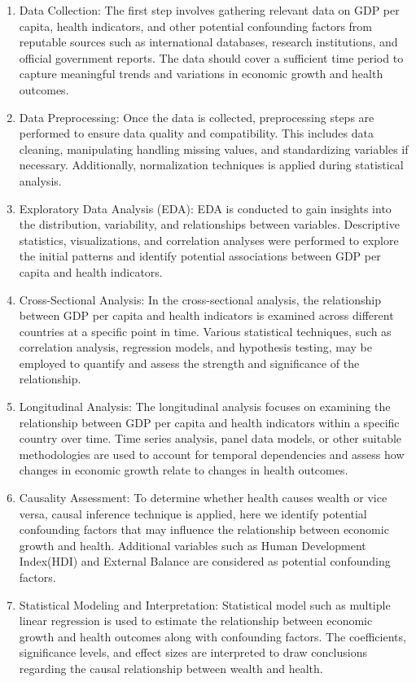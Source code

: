 \documentclass[
]{article}
\begin{document}
\begin{enumerate}
\def\labelenumi{\arabic{enumi}.}
\item
  Data Collection: The first step involves gathering relevant data on
  GDP per capita, health indicators, and other potential confounding
  factors from reputable sources such as international databases,
  research institutions, and official government reports. The data
  should cover a sufficient time period to capture meaningful trends and
  variations in economic growth and health outcomes.
\item
  Data Preprocessing: Once the data is collected, preprocessing steps
  are performed to ensure data quality and compatibility. This includes
  data cleaning, manipulating handling missing values, and standardizing
  variables if necessary. Additionally, normalization techniques is
  applied during statistical analysis.
\item
  Exploratory Data Analysis (EDA): EDA is conducted to gain insights
  into the distribution, variability, and relationships between
  variables. Descriptive statistics, visualizations, and correlation
  analyses were performed to explore the initial patterns and identify
  potential associations between GDP per capita and health indicators.
\item
  Cross-Sectional Analysis: In the cross-sectional analysis, the
  relationship between GDP per capita and health indicators is examined
  across different countries at a specific point in time. Various
  statistical techniques, such as correlation analysis, regression
  models, and hypothesis testing, may be employed to quantify and assess
  the strength and significance of the relationship.
\item
  Longitudinal Analysis: The longitudinal analysis focuses on examining
  the relationship between GDP per capita and health indicators within a
  specific country over time. Time series analysis, panel data models,
  or other suitable methodologies are used to account for temporal
  dependencies and assess how changes in economic growth relate to
  changes in health outcomes.
\item
  Causality Assessment: To determine whether health causes wealth or
  vice versa, causal inference technique is applied, here we identify
  potential confounding factors that may influence the relationship
  between economic growth and health. Additional variables such as Human
  Development Index(HDI) and External Balance are considered as
  potential confounding factors.
\item
  Statistical Modeling and Interpretation: Statistical model such as
  multiple linear regression is used to estimate the relationship
  between economic growth and health outcomes along with confounding
  factors. The coefficients, significance levels, and effect sizes are
  interpreted to draw conclusions regarding the causal relationship
  between wealth and health.
\end{enumerate}
\end{document}
